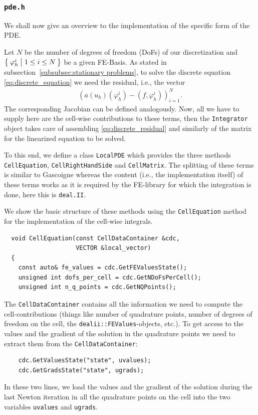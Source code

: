 \documentclass[smallextended]{svjour3}       %
\numberwithin{equation}{section}
\renewcommand{\phi}{\varphi}
\newcommand{\deal}{\texttt{deal.II}}
\begin{document}
\subsubsection{\texttt{pde.h}}
We shall now give an overview to the implementation of the specific form of the PDE. 

Let $N$ be the number of degrees of freedom (DoFs) of our discretization and $\Set{\phi_{h}^{i}|1\leq i \leq N}$ be a given FE-Basis. As stated in subsection~\ref{subsubsec:stationary problems}, to solve the discrete equation \eqref{eq:discrete_equation} we need the residual, i.e., the vector
\begin{align}\label{eq:discrete_residual}
\left(a(u_h)(\phi_{h}^{i})-(f,\phi_{h}^{i})\right)_{i=1}^N.
\end{align}
The corresponding Jacobian can be defined analogously.
Now, all we have to supply here are the cell-wise contributions to these terms,
then the \texttt{Integrator} object 
takes care of assembling \eqref{eq:discrete_residual}
and similarly of the matrix for the linearized equation to be solved.

To this end, we define a class \texttt{LocalPDE} which provides the three methods
\texttt{CellEquation}, \texttt{CellRightHandSide} and \texttt{CellMatrix}. 
The splitting of these terms is similar to Gascoigne
\cite{gascoigne} whereas the content (i.e., the 
implementation itself) of these
terms works as it is required by the FE-library for which the integration is done, here this is \deal{}.


We show the basic structure of these methods using the \texttt{CellEquation} 
method for the implementation of the cell-wise integrals.

\begin{lstlisting}
  void CellEquation(const CellDataContainer &cdc,
                    VECTOR &local_vector)
  {
    const auto& fe_values = cdc.GetFEValuesState();
    unsigned int dofs_per_cell = cdc.GetNDoFsPerCell();
    unsigned int n_q_points = cdc.GetNQPoints();
\end{lstlisting}
 The \texttt{CellDataContainer} contains all the information we need to compute the cell-contributions (things like number of quadrature points, number of degrees of freedom on the cell, the \texttt{dealii::FEValues}-objects, etc.).
To get access to the values and the gradient of the solution in the quadrature 
points we need to extract them from the \texttt{CellDataContainer}:
  \begin{lstlisting}
    cdc.GetValuesState("state", uvalues);
    cdc.GetGradsState("state", ugrads);
 \end{lstlisting}
 In these two lines, we load the values and the gradient of the solution 
during the last Newton iteration in all the quadrature points on the cell 
into the two variables \texttt{uvalues} and \texttt{ugrads}.
\end{document}
